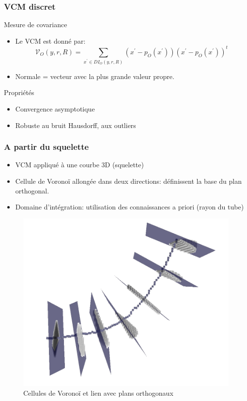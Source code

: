 \documentclass{beamer}
\begin{document}
\begin{frame}
	\frametitle{VCM discret}
	\begin{block}{Mesure de covariance}
	\begin{itemize}
		\item Le VCM est donné par: 		
		\[
			\mathcal{V}_O(y,r,R) = \sum_{x^{‎\prime} \in DI_O(y,r,R)} (x^{‎\prime} - p_O(x^{‎\prime}))(x^{‎\prime}-p_O(x^{‎\prime}))^t
		\]
		\item Normale = vecteur avec la plus grande valeur propre.
	\end{itemize}
	\end{block}
	\begin{block}{Propriétés\footnotemark}
		\begin{itemize}
			\item Convergence asymptotique
			\item Robuste au bruit Hausdorff, aux outliers
		\end{itemize}
	\end{block}
	\vspace{0.5cm}
							
	
\end{frame}

\begin{frame}
	\frametitle{A partir du squelette}
	\begin{itemize}
		\item VCM appliqué à une courbe 3D (squelette)
		\item Cellule de Voronoï allongée dans deux directions: définissent la base du plan orthogonal.
		\item Domaine d'intégration: utilisation des connaissances a priori (rayon du tube)
	\end{itemize}
	
	\vspace{-0.5cm}	
	\begin{figure}				
		\includegraphics[clip, trim=0 3cm 0 0, scale=0.16]{fig/vcm_courbe.png}
		\caption{Cellules de Voronoï et lien avec plans orthogonaux}
	\end{figure}
		
\end{frame}
\end{document}
